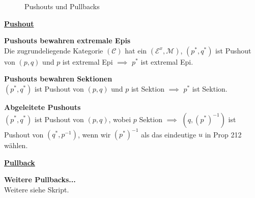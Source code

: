 \begin{figure}[h]
\centering
{} \qquad \qquad \qquad
{}
\caption{Pushouts und Pullbacks}
\end{figure}

\newpage 

\begin{multicols}{2}

\textbf{\underline{Pushout}} 

\textbf{ Pushouts bewahren extremale Epis} \\
Die zugrundeliegende Kategorie $(\mathcal{C})$ hat ein $(\mathcal{E}^x, \mathcal{M})$, $(p^*, q^*)$ ist Pushout von $(p,q)$ und $p$ ist extremal Epi $\implies$ $p^*$ ist extremal Epi.

\textbf{ Pushouts bewahren Sektionen} \\
$(p^*, q^*)$ ist Pushout von $(p,q)$ und $p$ ist Sektion $\implies $ $p^*$ ist Sektion.

\textbf{ Abgeleitete Pushouts} \\
$(p^*, q^*)$ ist Pushout von $(p,q)$, wobei $p$ Sektion $\implies$ $\left ( q, (p^*)^{-1} \right )$ ist Pushout von $(q^*, p^{-1})$, wenn wir $(p^*)^{-1}$ als das eindeutige $u$ in Prop 212 wählen.

\columnbreak

\textbf{\underline{Pullback}} 

\textbf{Weitere Pullbacks...} \\
Weitere siehe Skript.

\end{multicols}


